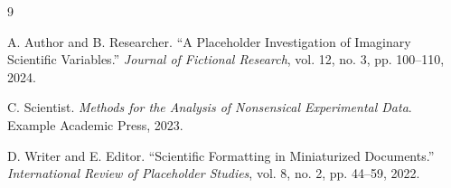 \documentclass[11pt]{article}
\begin{document}
\begin{thebibliography}{9}

A. Author and B. Researcher.
``A Placeholder Investigation of Imaginary Scientific Variables.''
\textit{Journal of Fictional Research},
vol. 12, no. 3, pp. 100--110, 2024.

C. Scientist.
\textit{Methods for the Analysis of Nonsensical Experimental Data}.
Example Academic Press, 2023.

D. Writer and E. Editor.
``Scientific Formatting in Miniaturized Documents.''
\textit{International Review of Placeholder Studies},
vol. 8, no. 2, pp. 44--59, 2022.

\end{thebibliography}
\end{document}
